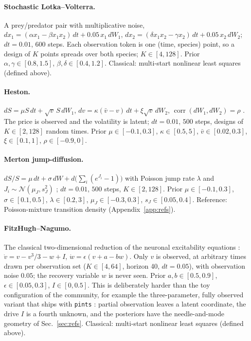 \documentclass[10pt]{article}
\newcommand{\N}{\mathcal{N}}
\begin{document}
\paragraph{Stochastic Lotka--Volterra.} A prey/predator pair with multiplicative noise,
$dx_1 = (\alpha x_1 - \beta x_1 x_2)\,dt + 0.05\,x_1\,dW_1$,
$dx_2 = (\delta x_1 x_2 - \gamma x_2)\,dt + 0.05\,x_2\,dW_2$; $dt = 0.01$, $600$ steps. Each
observation token is one (time, species) point, so a design of $K$ points spreads over both species;
$K \in [4, 128]$. Prior $\alpha, \gamma \in [0.8, 1.5]$, $\beta, \delta \in [0.4, 1.2]$. Classical:
multi-start nonlinear least squares (defined above).

\paragraph{Heston.} $dS = \mu S\,dt + \sqrt{v}\,S\,dW_1$, $dv = \kappa(\bar v - v)\,dt + \xi \sqrt{v}\,dW_2$,
$\operatorname{corr}(dW_1, dW_2) = \rho$ \citep{heston1993}. The price is observed and the volatility
is latent; $dt = 0.01$, $500$ steps, designs of $K \in [2, 128]$ random times. Prior
$\mu \in [-0.1, 0.3]$, $\kappa \in [0.5, 5]$, $\bar v \in [0.02, 0.3]$, $\xi \in [0.1, 1]$,
$\rho \in [-0.9, 0]$.

\paragraph{Merton jump-diffusion.} $dS/S = \mu\,dt + \sigma\,dW + d\bigl(\sum_i (e^{J_i} - 1)\bigr)$
with Poisson jump rate $\lambda$ and $J_i \sim \N(\mu_J, s_J^2)$ \citep{merton1976}; $dt = 0.01$,
$500$ steps, $K \in [2, 128]$. Prior $\mu \in [-0.1, 0.3]$, $\sigma \in [0.1, 0.5]$,
$\lambda \in [0.2, 3]$, $\mu_J \in [-0.3, 0.3]$, $s_J \in [0.05, 0.4]$. Reference: Poisson-mixture
transition density (Appendix~\ref{app:refs}).

\paragraph{FitzHugh--Nagumo.} The classical two-dimensional reduction of the neuronal excitability
equations \citep{fitzhugh1961,nagumo1962}: $\dot v = v - v^3/3 - w + I$,
$\dot w = \epsilon(v + a - b w)$. Only $v$ is observed, at arbitrary times drawn per observation set
($K \in [4, 64]$, horizon 40, $dt = 0.05$), with observation noise $0.05$; the recovery variable $w$
is never seen. Prior $a, b \in [0.5, 0.9]$, $\epsilon \in [0.05, 0.3]$, $I \in [0, 0.5]$. This is
deliberately harder than the toy configuration of the community, for example the three-parameter,
fully observed variant that ships with \texttt{pints} \citep{clerx2019}: partial observation leaves a
latent coordinate, the drive $I$ is a fourth unknown, and the posteriors have the needle-and-mode
geometry of Sec.~\ref{sec:refs}. Classical: multi-start nonlinear least squares (defined above).
\end{document}
